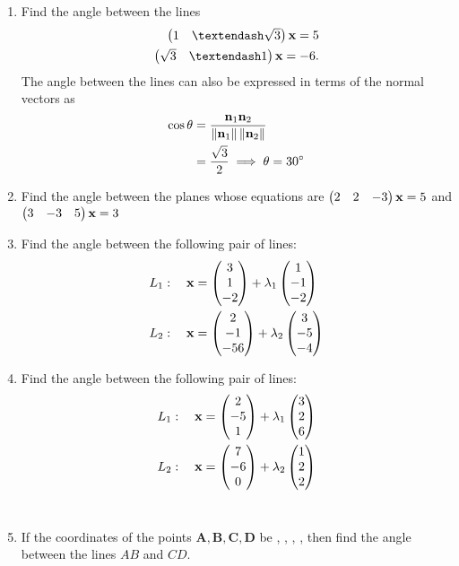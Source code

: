\documentclass[journal,12pt,twocolumn]{IEEEtran}
\renewcommand\thesection{\arabic{section}}
\begin{document}
\begin{enumerate}[label=\thesection.\arabic*.,ref=\thesection.\theenumi]
\item Find the angle between the lines 
%
\begin{align}
\myvec{1 & – \sqrt{3}}\vec{x}  = 5
\\
\myvec{\sqrt{3} & –1}\vec{x}  = -6
. 
\end{align}
%
\solution The angle between the lines can also be expressed in terms of the normal vectors as
%
\begin{align}
\cos \theta &= \frac{\mathbf{n}_1\mathbf{n}_2}{\left\lVert\mathbf{n}_1\right\rVert\left\lVert\mathbf{n}_2\right\rVert}
\\
&= \frac{\sqrt{3}}{2} \implies \theta = 30\degree
\end{align}
%
\item Find the angle between the planes whose equations are
$
\begin{pmatrix}2 & 2 & -3\end{pmatrix}\mathbf{x}=5
$
 and 
$
\begin{pmatrix}3 & -3 & 5\end{pmatrix}\mathbf{x}=3
$
\\
\solution
%
\item Find the angle between the following pair of lines:
\begin{align}
    L_1: \quad \mathbf{x} &= \begin{pmatrix}3\\1\\-2\end{pmatrix} + \lambda_1\begin{pmatrix}1 \\ -1 \\-2\end{pmatrix} \label{aug/22/eq:1} \\
    L_2: \quad \mathbf{x} &= \begin{pmatrix}2\\-1\\-56\end{pmatrix} + \lambda_2\begin{pmatrix}3 \\ -5 \\-4\end{pmatrix} \label{aug/22/eq:2}
    \end{align}
\solution
%
\item Find the angle between the following pair of lines:
\begin{align}
L_1: \quad \mathbf{x} &= \begin{pmatrix}2\\-5\\1\end{pmatrix} + \lambda_1\begin{pmatrix}3 \\ 2 \\6\end{pmatrix}
\\
L_2: \quad \mathbf{x} &= \begin{pmatrix}7\\-6\\0\end{pmatrix} + \lambda_2\begin{pmatrix}1 \\ 2 \\2\end{pmatrix}
\end{align}
\\
\solution
%
\item If the coordinates of the points $\bm{A}, \bm{B}, \bm{C}, \bm{D}$ be , , , , then find the angle between the lines $AB$ and $CD$.  
%
\\
\solution
%
\end{enumerate}
\end{document}
